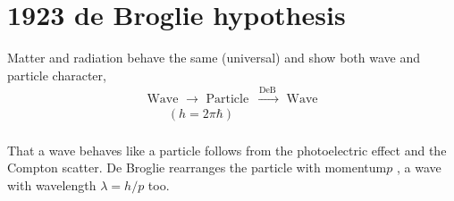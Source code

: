 \section{1923 de Broglie hypothesis}
Matter and radiation behave the same (universal) and show both wave and particle character,
\begin{equation}
\begin{array}{l}{\text { Wave } \longrightarrow \text { Particle } \stackrel{\text { DeB }}{\rightarrow} \text { Wave }} \\ {\qquad(h=2 \pi \hbar)}\end{array}
\end{equation}\\
That a wave behaves like a particle follows from the photoelectric effect and the Compton scatter. De Broglie rearranges the particle with momentum$ p$
, a wave with wavelength $\lambda=h/p$ too.

